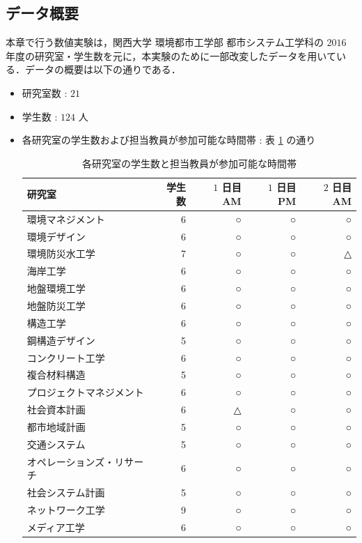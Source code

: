 \documentclass[a4paper,12pt,fleqn]{jarticle}
\begin{document}
\subsection{データ概要}
本章で行う数値実験は，関西大学 環境都市工学部 都市システム工学科の $2016$ 年度の研究室・学生数を元に，本実験のために一部改変したデータを用いている．データの概要は以下の通りである．
\begin{itemize}
\item 研究室数 : $21$
\item 学生数 : $124$ 人
\item 各研究室の学生数および担当教員が参加可能な時間帯 : 表 \ref{tb:LabData2016} の通り
 \begin{table}[H]
    \begin{center}
      \caption{各研究室の学生数と担当教員が参加可能な時間帯}
      \label{tb:LabData2016}
      \begin{tabular}{lrrrr} \toprule
        研究室 & 学生数 & $1$ 日目AM & $1$ 日目PM & $2$ 日目AM\\ \toprule
        環境マネジメント & 6 & ○ & ○ & ○\\ \hline
        環境デザイン & 6 & ○ & ○ & ○\\ \hline
        環境防災水工学 & 7 & ○ & ○ & △\\ \hline
        海岸工学 & 6 & ○ & ○ & ○\\ \hline
        地盤環境工学 & 6 & ○ & ○ & ○\\ \hline
        地盤防災工学 & 6 & ○ & ○ & ○\\ \hline
        構造工学 & 6 & ○ & ○ & ○\\ \hline
        鋼構造デザイン & 5 & ○ & ○ & ○\\ \hline
        コンクリート工学 & 6 & ○ & ○ & ○\\ \hline
        複合材料構造 & 5 & ○ & ○ & ○\\ \hline
        プロジェクトマネジメント & 6 & ○ & ○ & ○\\ \hline
        社会資本計画 & 6 & △ & ○ & ○\\ \hline
        都市地域計画 & 5 & ○ & ○ & ○\\ \hline
        交通システム & 5 & ○ & ○ & ○\\ \hline
        オペレーションズ・リサーチ & 6 & ○ & ○ & ○\\ \hline
        社会システム計画 & 5 & ○ & ○ & ○\\ \hline
        ネットワーク工学 & 9 & ○ & ○ & ○\\ \hline
        メディア工学 & 6 & ○ & ○ & ○\\ \hline

\end{tabular}
\end{center}
\end{table}
\end{itemize}
\end{document}
